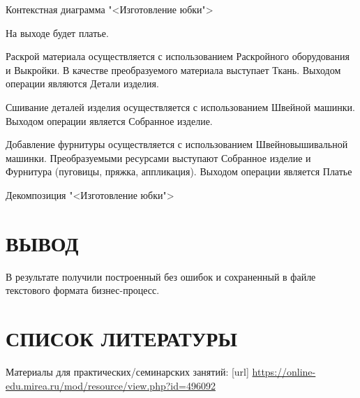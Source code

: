 \begin{image}
	\caption{Контекстная диаграмма "<Изготовление юбки">}
	\label{fig:2:IDEF0:a0}
\end{image}

На выходе будет платье.

Раскрой материала осуществляется с использованием Раскройного оборудования и Выкройки.
В качестве преобразуемого материала выступает Ткань.
Выходом операции являются Детали изделия.

Сшивание деталей изделия осуществляется с использованием Швейной машинки.
Выходом операции является Собранное изделие.

Добавление фурнитуры осуществляется с использованием Швейновышивальной машинки.
Преобразуемыми ресурсами выступают Собранное изделие и Фурнитура (пуговицы, пряжка, аппликация).
Выходом операции является Платье

\begin{image}
	\caption{Декомпозиция "<Изготовление юбки">}
	\label{fig:2:IDEF0:a0}
\end{image}

\section*{ВЫВОД}
В результате получили построенный без ошибок и сохраненный в файле текстового
формата бизнес-процесс.

\section*{СПИСОК ЛИТЕРАТУРЫ}
\begin{thebibliography}{}
    \bibitem{}  Материалы для практических/семинарских занятий: [url] 
		\url{https://online-edu.mirea.ru/mod/resource/view.php?id=496092}
\end{thebibliography}

